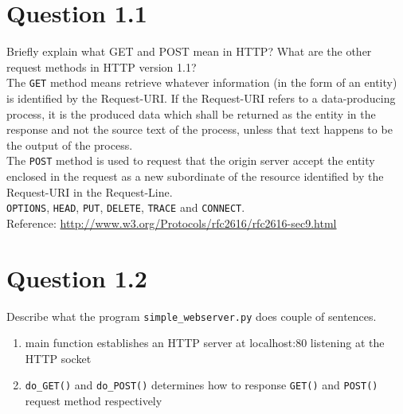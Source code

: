 \documentclass{article}
\newenvironment{homeworkProblem}[1]{
	\section*{#1}
	}{
}
\begin{document}
\newpage


\begin{homeworkProblem}{Question 1.1}
Briefly explain what GET and POST mean in HTTP? What are the other request methods in HTTP version 1.1?\\

The \texttt{GET} method means retrieve whatever information (in the form of an entity) is identified by the Request-URI. If the Request-URI refers to a data-producing process, it is the produced data which shall be returned as the entity in the response and not the source text of the process, unless that text happens to be the output of the process.\\

The \texttt{POST} method is used to request that the origin server accept the entity enclosed in the request as a new subordinate of the resource identified by the Request-URI in the Request-Line.\\

\texttt{OPTIONS}, \texttt{HEAD}, \texttt{PUT}, \texttt{DELETE}, \texttt{TRACE} and \texttt{CONNECT}.\\

Reference: \url{http://www.w3.org/Protocols/rfc2616/rfc2616-sec9.html}
\end{homeworkProblem}


\begin{homeworkProblem}{Question 1.2}
Describe what the program \texttt{simple\_webserver.py} does couple of sentences.

\begin{enumerate}
\item main function establishes an HTTP server at localhost:80 listening at the HTTP socket
\item \texttt{do\_GET()} and \texttt{do\_POST()} determines how to response \texttt{GET()} and \texttt{POST()} request method respectively
\end{enumerate}
\end{homeworkProblem}

\end{document}
